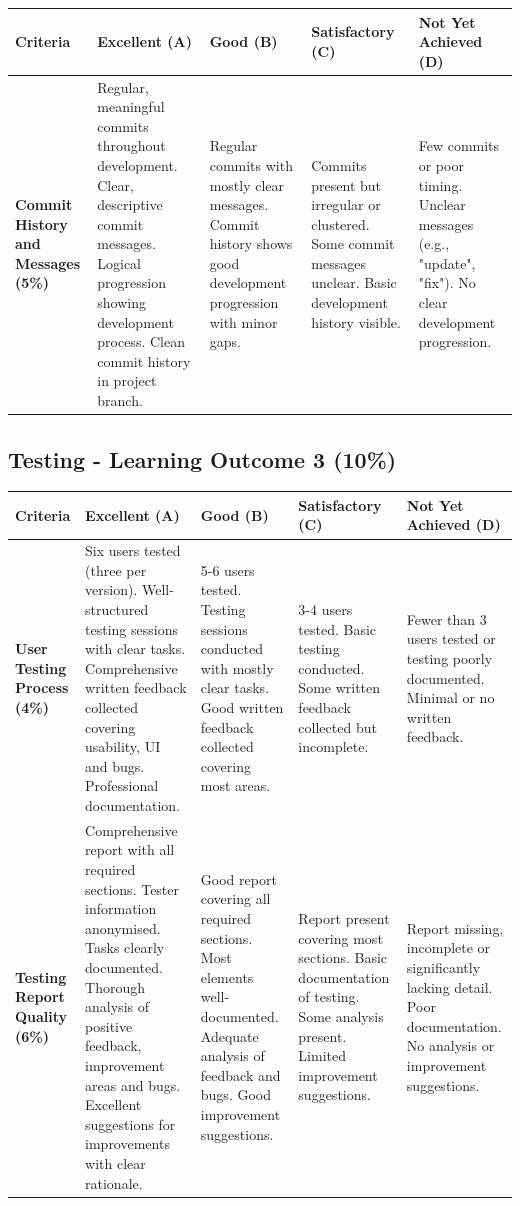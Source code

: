 \documentclass{article}
\begin{document}
\begin{landscape}
\begin{tabular}{|p{5cm}|p{4cm}|p{4cm}|p{4cm}|p{4cm}|}
\hline
\textbf{Criteria} & \textbf{Excellent (A)} & \textbf{Good (B)} & \textbf{Satisfactory (C)} & \textbf{Not Yet Achieved (D)} \\ \hline

\textbf{Commit History and Messages (5\%)} & 
Regular, meaningful commits throughout development. Clear, descriptive commit messages. Logical progression showing development process. Clean commit history in project branch. & 
Regular commits with mostly clear messages. Commit history shows good development progression with minor gaps. & 
Commits present but irregular or clustered. Some commit messages unclear. Basic development history visible. & 
Few commits or poor timing. Unclear messages (e.g., "update", "fix"). No clear development progression. \\ \hline

\end{tabular}

\subsection*{Testing - Learning Outcome 3 (10\%)}

\begin{tabular}{|p{5cm}|p{4cm}|p{4cm}|p{4cm}|p{4cm}|}
\hline
\textbf{Criteria} & \textbf{Excellent (A)} & \textbf{Good (B)} & \textbf{Satisfactory (C)} & \textbf{Not Yet Achieved (D)} \\ \hline

\textbf{User Testing Process (4\%)} & 
Six users tested (three per version). Well-structured testing sessions with clear tasks. Comprehensive written feedback collected covering usability, UI and bugs. Professional documentation. & 
5-6 users tested. Testing sessions conducted with mostly clear tasks. Good written feedback collected covering most areas. & 
3-4 users tested. Basic testing conducted. Some written feedback collected but incomplete. & 
Fewer than 3 users tested or testing poorly documented. Minimal or no written feedback. \\ \hline

\textbf{Testing Report Quality (6\%)} & 
Comprehensive report with all required sections. Tester information anonymised. Tasks clearly documented. Thorough analysis of positive feedback, improvement areas and bugs. Excellent suggestions for improvements with clear rationale. & 
Good report covering all required sections. Most elements well-documented. Adequate analysis of feedback and bugs. Good improvement suggestions. & 
Report present covering most sections. Basic documentation of testing. Some analysis present. Limited improvement suggestions. & 
Report missing, incomplete or significantly lacking detail. Poor documentation. No analysis or improvement suggestions. \\ \hline


\end{tabular}
\end{landscape}
\end{document}
